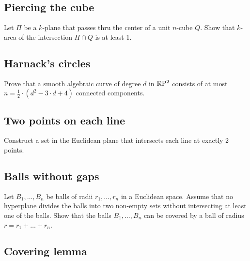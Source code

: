 \subsection*{Piercing the cube}\label{Piercing the cube}

\begin{pr}
Let $\Pi$ be a $k$-plane that passes thru the center of a unit $n$-cube $Q$.
Show that $k$-area of the intersection $\Pi\cap Q$ is at least 1.
\end{pr}


\subsection*{Harnack's circles}\label{Harnack}

\begin{pr}
Prove that a smooth algebraic curve of degree $d$ in $\mathbb{R}\mathrm{P}^2$ consists of at most $n=\tfrac12\cdot(d^2-3\cdot d+4)$ connected components.
\end{pr}

\subsection*{Two points on each line}\label{2pts-on-line}

\begin{pr}
Construct a set in the Euclidean plane that intersects each line at exactly 2 points. 
\end{pr}

\subsection*{Balls without gaps}
\label{Balls without gaps}

\begin{pr}
Let $B_1,\dots,B_n$ be balls  
of radii $r_1,\dots,r_n$ 
in a Euclidean space.
Assume that no hyperplane divides the balls into two
non-empty sets without intersecting at least one of the balls. 
Show that the balls
$B_1,\dots,B_n$ can be covered by a ball of radius
$r=r_1+\dots+r_n$.

\end{pr}

\subsection*{Covering lemma}

